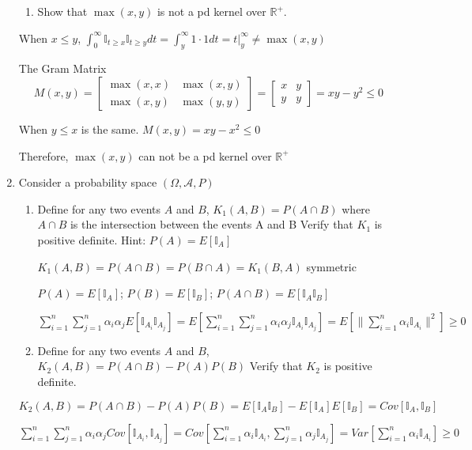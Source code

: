 \documentclass[11pt]{article}
\begin{document}
\begin{enumerate}
\begin{enumerate}
\item Show that $\max(x,y)$ is not a pd kernel over  $\mathbb{R}^+$. 
\end{enumerate}

\vspace{2mm}

When $x\le y$, $\int_0^\infty \mathbb{I}_{t\geq x} \mathbb{I}_{t\geq y} dt=\int_y^\infty 1\cdot 1 dt=\left.t\right|_y^\infty\neq\max(x,y)$

The Gram Matrix
$$M(x,y)=\begin{bmatrix}\max(x, x) & \max(x, y)\\\max(x,y) & \max(y,y)\end{bmatrix} =
       \begin{bmatrix}x &y \\y & y\end{bmatrix}=xy-y^2\le 0$$

When $y\le x$ is the same. $M(x,y)=xy-x^2\le 0$

Therefore, $\max(x,y)$ can not be a pd kernel over  $\mathbb{R}^+$


\item Consider a probability space $(\Omega,\mathcal{A},P)$



\begin{enumerate}
\item Define for any two events $A$ and $B$, $K_1(A,B)=P(A \cap B)$
where $A \cap B$ is the intersection between the events A and B 
Verify that $K_1$ is positive definite. Hint: $P(A)=E[\mathbb{I}_A]$

\vspace{2mm}
$K_1(A,B)=P(A \cap B)=P(B \cap A)=K_1(B,A)$ symmetric

$P(A)=E[\mathbb{I}_A]$; $P(B)=E[\mathbb{I}_B]$; $P(A\cap B)=E[\mathbb{I}_A\mathbb{I}_B]$

$\sum_{i=1}^n\sum_{j=1}^n\alpha_i\alpha_jE[\mathbb{I}_{A_i}\mathbb{I}_{A_j}]=E[\sum_{i=1}^n\sum_{j=1}^n\alpha_i\alpha_j\mathbb{I}_{A_i}\mathbb{I}_{A_j}]=E[\|\sum_{i=1}^n\alpha_i\mathbb{I}_{A_i}\|^2]\ge0$
\vspace{3mm}

\item Define for any two events $A$ and $B$, 
$K_2(A,B)=P(A \cap B)-P(A)P(B)$
Verify that $K_2$ is positive definite. 
\end{enumerate}

\vspace{2mm}
$K_2(A,B)=P(A \cap B)-P(A)P(B)=E[\mathbb{I}_A\mathbb{I}_B]-E[\mathbb{I}_A]E[\mathbb{I}_B]=Cov[\mathbb{I}_A,\mathbb{I}_B]$

$\sum_{i=1}^n\sum_{j=1}^n\alpha_i\alpha_jCov[\mathbb{I}_{A_i},\mathbb{I}_{A_j}]=Cov[\sum_{i=1}^n\alpha_i\mathbb{I}_{A_i},\sum_{j=1}^n\alpha_j\mathbb{I}_{A_j}]=Var[\sum_{i=1}^n\alpha_i\mathbb{I}_{A_i}]\ge 0$



\end{enumerate}
\end{document}
